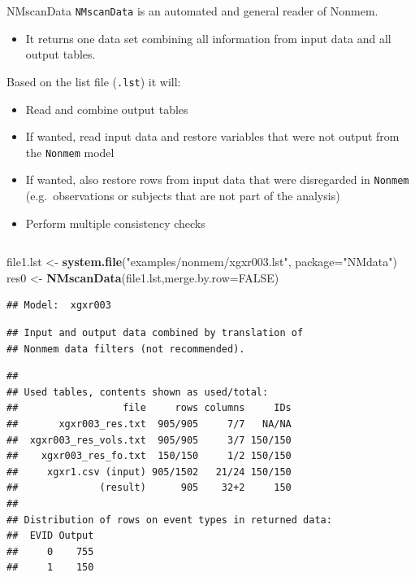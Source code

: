 \documentclass[
  8pt,
  ignorenonframetext,
  aspectratio=169]{beamer}
\newenvironment{Shaded}{\begin{snugshade}}{\end{snugshade}}
\newcommand{\DataTypeTok}[1]{\textcolor[rgb]{0.13,0.29,0.53}{#1}}
\newcommand{\KeywordTok}[1]{\textcolor[rgb]{0.13,0.29,0.53}{\textbf{#1}}}
\newcommand{\NormalTok}[1]{#1}
\newcommand{\OtherTok}[1]{\textcolor[rgb]{0.56,0.35,0.01}{#1}}
\newcommand{\StringTok}[1]{\textcolor[rgb]{0.31,0.60,0.02}{#1}}
\providecommand{\tightlist}{%
  \setlength{\itemsep}{0pt}\setlength{\parskip}{0pt}}
\begin{document}
\begin{frame}[fragile]{NMscanData}
\protect\hypertarget{nmscandata}{}
\texttt{NMscanData} is an automated and general reader of Nonmem.

\begin{itemize}
\tightlist
\item
  It returns one data set combining all information from input data and
  all output tables.
\end{itemize}

Based on the list file (\texttt{.lst}) it will:

\begin{itemize}
\tightlist
\item
  Read and combine output tables
\item
  If wanted, read input data and restore variables that were not output
  from the \texttt{Nonmem} model
\item
  If wanted, also restore rows from input data that were disregarded in
  \texttt{Nonmem} (e.g.~observations or subjects that are not part of
  the analysis)
\item
  Perform multiple consistency checks
\end{itemize}

\pause
\footnotesize

\begin{columns}[T]
\begin{column}{0.48\textwidth}
\begin{Shaded}
\begin{Highlighting}[]
\NormalTok{file1.lst \textless{}{-}}\StringTok{ }\KeywordTok{system.file}\NormalTok{(}\StringTok{"examples/nonmem/xgxr003.lst"}\NormalTok{,}
                         \DataTypeTok{package=}\StringTok{"NMdata"}\NormalTok{)}
\NormalTok{res0 \textless{}{-}}\StringTok{ }\KeywordTok{NMscanData}\NormalTok{(file1.lst,}\DataTypeTok{merge.by.row=}\OtherTok{FALSE}\NormalTok{)}
\end{Highlighting}
\end{Shaded}

\begin{verbatim}
## Model:  xgxr003
\end{verbatim}

\begin{verbatim}
## Input and output data combined by translation of
## Nonmem data filters (not recommended).
\end{verbatim}

\begin{verbatim}
## 
## Used tables, contents shown as used/total:
##                  file     rows columns     IDs
##       xgxr003_res.txt  905/905     7/7   NA/NA
##  xgxr003_res_vols.txt  905/905     3/7 150/150
##    xgxr003_res_fo.txt  150/150     1/2 150/150
##     xgxr1.csv (input) 905/1502   21/24 150/150
##              (result)      905    32+2     150
## 
## Distribution of rows on event types in returned data:
##  EVID Output
##     0    755
##     1    150
\end{verbatim}
\end{column}


\end{columns}
\end{frame}
\end{document}
